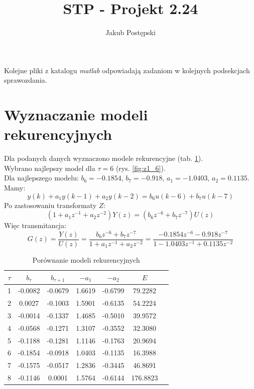 \documentclass[a4paper, 10pt]{article}
\author{Jakub Postępski}
\title{STP - Projekt 2.24}
\begin{document}
	\maketitle
	Kolejne pliki z katalogu \textit{matlab} odpowiadają zadaniom w kolejnych podsekcjach sprawozdania.
	\section{Wyznaczanie modeli rekurencyjnych}
	Dla podanych danych wyznaczono modele rekurencyjne (tab. \ref{tab:z1}).\\
	Wybrano najlepszy model dla $\tau=6$ (rys. \ref{fig:z1_6}). \\
	Dla najlepszego modelu: $b_6 = -0.1854$, $b_7=-0.918$, $a_1=-1.0403$, $a_2=0.1135$.\\
	Mamy:
	\[y(k)+a_1y(k-1) + a_2y(k-2)=b_6u(k-6)+b_7u(k-7)\]
	Po zastosowaniu transformaty $Z$:
	\[(1+a_1z^{-1} + a_2z^{-2})Y(z)=(b_6z^{-6}+b_7z^{-7})U(z)\]
	Więc transmitancja:
	\[G(z)=\frac{Y(z)}{U(z)}=\frac{b_6z^{-6}+b_7z^{-7}}{1+a_1z^{-1} + a_2z^{-2}}=\frac{-0.1854z^{-6}-0.918z^{-7}}{1-1.0403z^{-1} + 0.1135z^{-2}}\]
	\begin{table}[H]
	\centering
	\begin{tabular}{|c|c|c|c|c|c|c|}
	\hline 
	$\tau$ & $b_\tau$ & $b_{\tau+1}$ & $-a_1$ & $-a_2$ & $E$  \\ 
	\hline 
	 1 & -0.0082 & -0.0679 &  1.6619 & -0.6799
	  & 79.2282 \\ 
	\hline 
	2 & 0.0027 & -0.1003
	  &  1.5901 & -0.6135 & 54.2224 \\ 
	\hline 
	3 & -0.0014 & -0.1337 &  1.4685  & -0.5010 & 39.9572\\ 
	\hline 
	4 & -0.0568 & -0.1271 & 1.3107 & -0.3552
	  & 32.3080  \\ 
	\hline 
 5 & -0.1188 & -0.1281 & 1.1146 &  -0.1763 & 20.9694 \\ 
	\hline 
	6 & -0.1854  &  -0.0918 &  1.0403  & -0.1135 & 16.3988 \\ 
	\hline 
	7 & -0.1575 & -0.0517  & 1.2836 & -0.3445  & 46.8691
	\\ 
	\hline
	8 & -0.1146 & 0.0001  & 1.5764 & -0.6144 & 176.8823 \\ 
	\hline 
	\end{tabular}
	\label{tab:z1}
	\caption{Porównanie modeli rekurencyjnych}
	\end{table}
	
\end{document}
